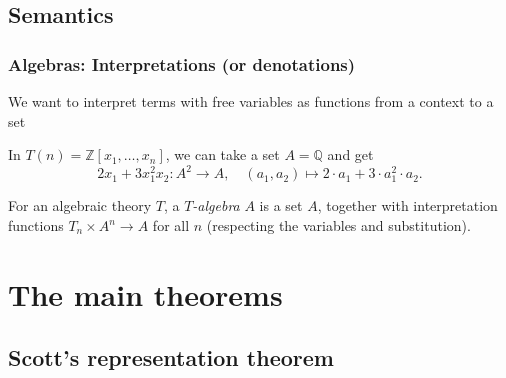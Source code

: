 \documentclass[aspectratio=169]{fancyslides} %
\begin{document}
  \subsection{Semantics}
  \begin{frame}
    \frametitle{Algebras: Interpretations (or denotations)}
    We want to interpret terms with free variables as functions from a context to a set

    \begin{example}
      In $ T(n) = \mathbb Z[x_1, \dots, x_n] $, we can take a set $ A = \mathbb Q $ and get
      \[ 2 x_1 + 3 x_1^2 x_2: A^2 \to A, \quad (a_1, a_2) \mapsto 2 \cdot a_1 + 3 \cdot a_1^2 \cdot a_2. \]
    \end{example}

    \pause

    \begin{definition}
      For an algebraic theory $ T $, a \textit{$ T $-algebra} $ A $ is a set $ A $, together with interpretation functions $ T_n \times A^n \to A $ for all $ n $ (respecting the variables and substitution).
    \end{definition}
  \end{frame}

  \section{The main theorems}

  \subsection{Scott's representation theorem}

  \begin{frame}[fragile]
    \begin{columns}
      \begin{column}{.5\textwidth}
        \tableofcontents[currentsubsection]
      \end{column}
      \begin{column}{.5\textwidth}
      \end{column}
    \end{columns}
  \end{frame}
\end{document}
